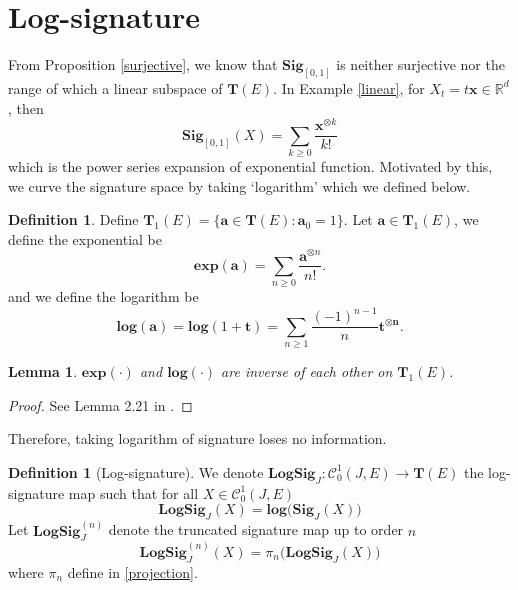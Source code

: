 \documentclass[12pt]{report}
\newtheorem{lemma}[theorem]{Lemma}
\theoremstyle{definition}
\newtheorem{definition}[theorem]{Definition}
\theoremstyle{remark}
\newcommand{\R}{\mathbb{R}}
\begin{document}
\section{Log-signature}
From Proposition \ref{surjective}, we know that $\mathbf{Sig}_{[0,1]}$ is neither surjective nor the range of which a linear subspace of $\mathbf{T}(E)$. In Example \ref{linear}, for $X_{t} = t\mathbf{x} \in \R^{d}$, then 
  \begin{equation}
    \mathbf{Sig}_{[0,1]}(X) = \sum_{k\geq 0}\frac{\mathbf{x}^{\otimes k}}{k!}
  \end{equation}
  which is the power series expansion of exponential function. Motivated by this, we curve the signature space by taking `logarithm' which we defined below. 
\begin{definition}
  Define $\mathbf{T}_{1}(E) = \{\mathbf{a} \in \mathbf{T}(E)\colon \mathbf{a}_{0} = 1\}$. Let $\mathbf{a} \in \mathbf{T}_{1}(E)$, we define the exponential be 
  \begin{equation}
    \mathbf{exp}(\mathbf{a}) = \sum_{n\geq 0}\frac{\mathbf{a}^{\otimes n}}{n!}.
  \end{equation}
  and we define the logarithm be
  \begin{equation}
    \mathbf{log}(\mathbf{a}) = \mathbf{log}(1+\mathbf{t}) = \sum_{n\geq 1} \frac{(-1)^{n-1}}{n}\mathbf{t}^{\otimes \mathbf{n}}.
  \end{equation}
\end{definition}
\begin{lemma}
  $\mathbf{exp}(\cdot)$ and $\mathbf{log}(\cdot)$ are inverse of each other on $\mathbf{T}_{1}(E)$.
\end{lemma}
\begin{proof}
  See Lemma 2.21 in \cite{lyons2007differential}.
\end{proof}
Therefore, taking logarithm of signature loses no information.
\begin{definition}[Log-signature]
  We denote $\mathbf{LogSig}_{J} \colon \mathcal{C}^{1}_{0}(J,E) \to \mathbf{T}(E)$ the log-signature map such that for all $X \in \mathcal{C}^{1}_{0}(J,E)$
  \begin{equation}
    \mathbf{LogSig}_{J}(X) = \mathbf{log}\big(\mathbf{Sig}_{J}(X)\big)
  \end{equation}
  Let $\mathbf{LogSig}^{(n)}_{J}$ denote the truncated signature map up to order $n$
  \begin{equation}
    \mathbf{LogSig}^{(n)}_{J}(X) = \pi_{n}\big(\mathbf{LogSig}_{J}(X)\big)
  \end{equation}
  where $\pi_n$ define in \eqref{projection}.
\end{definition}
\end{document}
